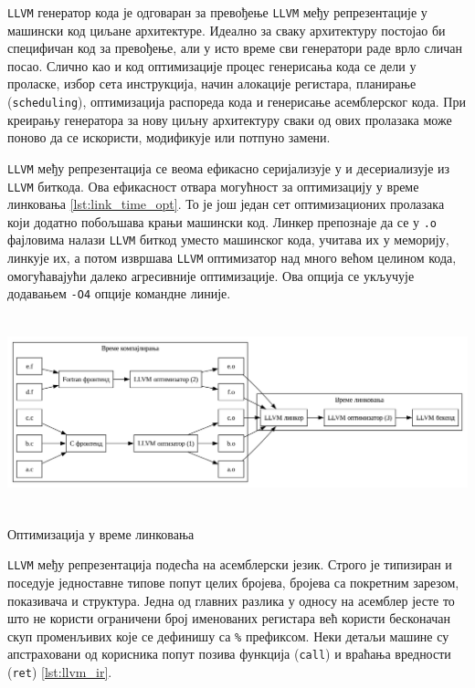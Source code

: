 \verb|LLVM| генератор кода је одговаран за превођење \verb|LLVM| међу репрезентације у машински код циљане 
архитектуре. Идеално за сваку архитектуру постојао би специфичан код за превођење, али у исто време 
сви генератори раде врло сличан посао. Слично као и код оптимизације процес генерисања кода се дели у проласке,
избор сета инструкција, начин алокације регистара, планирање (\verb|scheduling|), оптимизација распореда 
кода и генерисање асемблерског кода. При креирању генератора за нову циљну архитектуру сваки од ових пролазака
може поново да се искористи, модификује или потпуно замени.

\verb|LLVM| међу репрезентација се веома ефикасно серијализује у и десериализује из \verb|LLVM| биткода. 
Ова ефикасност отвара могућност за оптимизацију у време линковања \ref{lst:link_time_opt}. То је још један сет оптимизационих пролазака 
који додатно побољшава крањи машински код. Линкер препознаје да се у \verb|.o| фајловима налази 
\verb|LLVM| биткод уместо машинског кода, учитава их у меморију, линкује их, а потом извршава \verb|LLVM|
оптимизатор над много већом целином кода, омогућавајући далеко агресивније оптимизације. 
Ова опција се укључује додавањем \verb|-O4| опције командне линије. 

\begin{listing}[H]
\begin{center}
\includegraphics[width=6in, height=2.2in]{assets/images/link_time_optimization.png}
\end{center}
\caption{Оптимизација у време линковања}
\label{lst:link_time_opt}
\end{listing}

\verb|LLVM| међу репрезентација подесћа на асемблерски језик. Строго је типизиран и поседује једноставне 
типове попут целих бројева, бројева са покретним зарезом, показивача и структура. Једна од главних разлика 
у односу на асемблер јесте то што не користи ограничени број именованих регистара већ користи бесконачан 
скуп променљивих које се дефинишу са \verb|%| префиксом. Неки детаљи машине су апстраховани од корисника 
попут позива функција (\verb|call|) и враћања вредности (\verb|ret|) \ref{lst:llvm_ir}.


